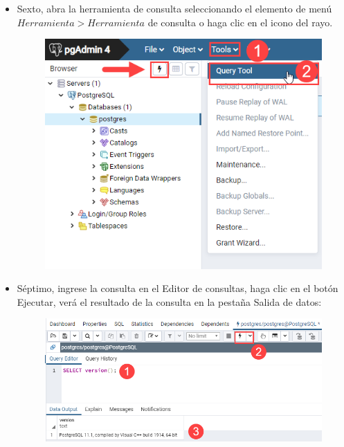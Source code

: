 \documentclass[10pt]{article}
\begin{document}
\begin{itemize}
\item  Sexto, abra la herramienta de consulta seleccionando el elemento de menú $Herramienta> Herramienta$ de consulta o haga clic en el icono del rayo.

\begin{figure}[H]
  \begin{center}
  	 \includegraphics{figures/cap2/img10.png}	 
	 \renewcommand{\arraystretch}{1.3}
  \end{center}
\end{figure}

\item 
Séptimo, ingrese la consulta en el Editor de consultas, haga clic en el botón Ejecutar, verá el resultado de la consulta en la pestaña Salida de datos:

\begin{figure}[H]
  \begin{center}
  	 \includegraphics{figures/cap2/img11.png}	 
	 \renewcommand{\arraystretch}{1.3}
  \end{center}
\end{figure}

\end{itemize}
\end{document}
